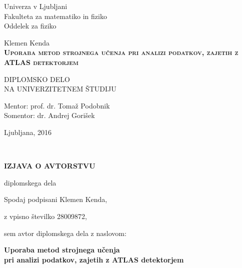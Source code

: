 \thispagestyle{empty} 

\begin{center}
{\large 
Univerza v Ljubljani\\
Fakulteta za matematiko in fiziko\\
Oddelek za fiziko
}

\vspace{3cm}
{\LARGE Klemen Kenda}\\

\vspace{2cm}
\textsc{\textbf{
\LARGE 
Uporaba metod strojnega učenja pri analizi podatkov, zajetih z ATLAS detektorjem }}

\vspace{2cm}
{ DIPLOMSKO DELO}\\
{ NA UNIVERZITETNEM ŠTUDIJU\\}

\vspace{2cm} 
{\Large Mentor: prof. dr. Tomaž Podobnik} \\
{\Large Somentor: dr. Andrej Gorišek}

\vfill
{\Large Ljubljana, 2016}
\end{center}

\newpage

\ \thispagestyle{empty}
\newpage

\thispagestyle{empty}

\vspace{1cm}
\begin{center} 
{\Large \textbf{IZJAVA O AVTORSTVU}}
\end{center}

\begin{center} 
{\Large diplomskega dela}
\end{center}

\vspace{1cm}
Spodaj podpisani \hspace{0.5cm} Klemen Kenda,

\vspace{0.1cm}
z vpisno številko \hspace{0.65cm} 28009872,

\vspace{1cm}
sem avtor diplomskega dela z naslovom:
   
\vspace{1.5cm}
\begin{center}
\textbf{Uporaba metod strojnega učenja \\
pri analizi podatkov, zajetih z ATLAS detektorjem}
\end{center}

